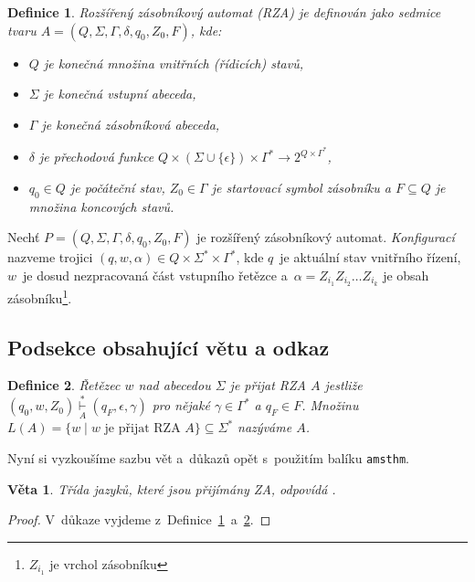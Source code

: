 \documentclass[a4paper, 11pt, twocolumn]{article}
\newtheorem{definition}{Definice}
\newtheorem{sentence}{Věta}
\begin{document}
\begin{definition}\label{def:one}
{\normalfont Rozšířený zásobníkový automat} (RZA) je definován jako sedmice tvaru $A=(Q, \Sigma, \Gamma, \delta, q_0, Z_0, F)$, kde:
\renewcommand\labelitemi{$\bullet$}
\begin{itemize}
\item $Q$ je konečná množina {\normalfont vnitřních (řídicích) stavů},

\item $\Sigma$ je konečná {\normalfont vstupní abeceda},

\item $\Gamma$ je konečná {\normalfont zásobníková abeceda},

\item $\delta$ je {\normalfont přechodová funkce} $Q \times (\Sigma\cup\{\epsilon\})\times\Gamma^\ast\rightarrow2^{Q\times\Gamma^\ast}$,

\item $q_0\in Q$ je {\normalfont počáteční stav}, $Z_0\in\Gamma$ je {\normalfont startovací symbol
zásobníku} a $F \subseteq Q$ je množina {\normalfont koncových stavů}.
\end{itemize}
\end{definition}

Nechť $P=(Q,\Sigma,\Gamma,\delta,q_0,Z_0,F)$ je rozšířený zásobníkový automat. \textit{Konfigurací} nazveme trojici $(q,w,\alpha) \in Q\times\Sigma^\ast\times\Gamma^\ast$, kde $q$~je aktuální stav vnitřního řízení, $w$~je dosud nezpracovaná část vstupního řetězce a~$\alpha=Z_{i_1}Z_{i_2}\dots Z_{i_k}$ je obsah zásobníku\footnote{$Z_{i_1}$
je vrchol zásobníku}.

\subsection{Podsekce obsahující větu a odkaz}
\begin{definition}\label{def:two}
{\normalfont Řetězec $w$ nad abecedou $\Sigma$ je přijat RZA} $A$ jestliže $(q_0,w,Z_0) \overset{*}{\underset{A}\vdash} (q_F,\epsilon,\gamma)$ pro nějaké $\gamma\in\Gamma^\ast$ a $q_F\in F$. Množinu $L(A)=\{w\;|\;w\text{ je přijat RZA }A\} \subseteq\Sigma^\ast$ nazýváme  $A$.
\end{definition}

\newpage
Nyní si vyzkoušíme sazbu vět a~důkazů opět s~použitím balíku \texttt{amsthm}.

\begin{sentence}
Třída jazyků, které jsou přijímány ZA, odpovídá .
\end{sentence}
\begin{proof}
V~důkaze vyjdeme z~Definice~\ref{def:one}~a~\ref{def:two}.
\end{proof}
\end{document}
